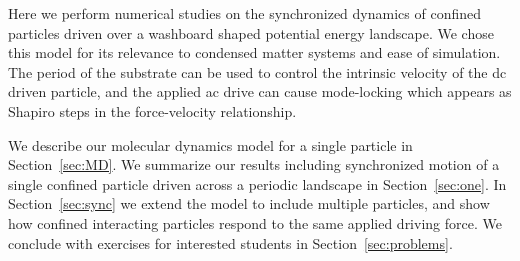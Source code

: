 \documentclass[twocolumn,preprintnumbers,amsmath,amssymb,aps,prx]{revtex4}
\begin{document}
Here we perform numerical studies 
on the synchronized dynamics
of confined particles driven over
a washboard shaped potential energy landscape.
We chose this model for its
relevance to condensed matter systems
and ease of simulation.
The period of the substrate
can be used to control the
intrinsic velocity of the dc driven particle,
and the applied ac drive can cause mode-locking
which appears as
Shapiro steps in the force-velocity relationship.



We describe
our molecular dynamics model for a single particle in Section~\ref{sec:MD}.
We summarize
our results 
including synchronized motion of a single confined particle
driven across a periodic landscape in 
Section~\ref{sec:one}.
In Section~\ref{sec:sync}
we 
extend the model to include multiple particles,
and show how confined 
interacting particles respond to the same applied driving force.
We conclude with
exercises for interested students 
in Section~\ref{sec:problems}.
\end{document}
